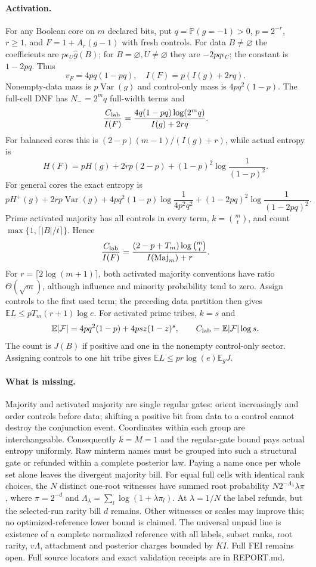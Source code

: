 \documentclass[11pt]{article}
\newcommand{\E}{\mathbb E}
\newcommand{\Prb}{\mathbb P}
\begin{document}
\paragraph{Activation.} For any Boolean core on $m$ declared bits, put $q=\Prb(g=-1)>0$,
$p=2^{-r}$, $r\ge1$, and $F=1+A_r(g-1)$ with fresh controls.
For data $B\ne\varnothing$ the coefficients are $p\epsilon_U\widehat g(B)$;
for $B=\varnothing,U\ne\varnothing$ they are $-2pq\epsilon_U$; the constant is $1-2pq$.
Thus
\[
 v_F=4pq(1-pq),\quad I(F)=p(I(g)+2rq).
\]
Nonempty-data mass is $p\operatorname{Var}(g)$ and control-only mass is
$4pq^2(1-p)$. The full-cell DNF has $N_-=2^mq$ full-width terms and
\[
 \frac{C_{\rm lab}}{I(F)}=
 \frac{4q(1-pq)\log(2^mq)}{I(g)+2rq}.
\]
For balanced cores this is $(2-p)(m-1)/(I(g)+r)$, while actual entropy is
\[
 H(F)=pH(g)+2rp(2-p)+(1-p)^2\log\frac1{(1-p)^2}.
\]
For general cores the exact entropy is
\[
 pH^+(g)+2rp\operatorname{Var}(g)+4pq^2(1-p)\log\frac1{4p^2q^2}
 +(1-2pq)^2\log\frac1{(1-2pq)^2}.
\]
Prime activated majority has all controls in every term, $k=\binom mt$,
and count $\max\{1,\lceil |B|/t\rceil\}$. Hence
\[
 \frac{C_{\rm lab}}{I(F)}=
 \frac{(2-p+T_m)\log\binom mt}{I(\mathrm{Maj}_m)+r}.
\]
For $r=\lceil2\log(m+1)\rceil$, both activated majority conventions have
ratio $\Theta(\sqrt m)$, although influence and minority probability tend to zero.
Assign controls to the first used term; the preceding data partition then gives
$\E L\le pT_m(r+1)\log e$.
For activated prime tribes, $k=s$ and
\[
 \E|\mathcal F|=4pq^2(1-p)+4psz(1-z)^s,\qquad
 C_{\rm lab}=\E|\mathcal F|\log s.
\]
The count is $J(B)$ if positive and one in the nonempty control-only sector.
Assigning controls to one hit tribe gives $\E L\le pr\log(e)\E_gJ$.

\paragraph{What is missing.} Majority and activated majority are single regular gates:
orient increasingly and order controls before data; shifting a positive bit from data to a control
cannot destroy the conjunction event. Coordinates within each group are interchangeable.
Consequently $k=M=1$ and the regular-gate bound pays actual entropy uniformly.
Raw minterm names must be grouped into such a structural gate or refunded within a complete posterior law.
Paying a name once per whole set alone leaves the divergent majority bill.
For equal full cells with identical rank choices, the $N$ distinct one-root witnesses have summed
root probability $N2^{-\Lambda_\lambda}\lambda\pi$, where $\pi=2^{-d}$ and
$\Lambda_\lambda=\sum_l\log(1+\lambda\pi_l)$.
At $\lambda=1/N$ the label refunds, but the selected-run rarity bill $d$ remains.
Other witnesses or scales may improve this; no optimized-reference lower bound is claimed.
The universal unpaid line is existence of a complete normalized reference with all labels,
subset ranks, root rarity, $v\Lambda$, attachment and posterior charges bounded by $KI$.
Full FEI remains open. Full source locators and exact validation receipts are in REPORT.md.
\end{document}
